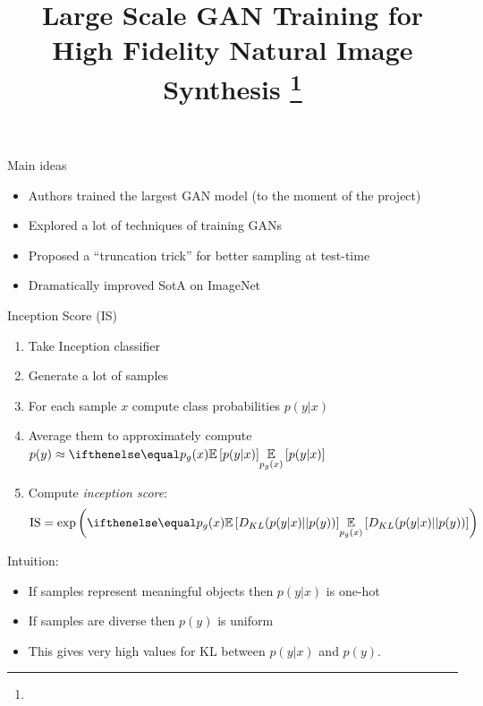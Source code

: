 \documentclass[handout, 10pt]{beamer}
\title{Large Scale GAN Training for High Fidelity Natural Image Synthesis \footnote{\citepaper{BigGAN}}}
\begin{document}
\begin{frame}
    \titlepage
\end{frame}

\begin{frame}{Main ideas}
    \pause
    \begin{itemize}
        \item\pause Authors trained the largest GAN model (to the moment of the project)
        \item\pause Explored a lot of techniques of training GANs
        \item\pause Proposed a ``truncation trick'' for better sampling at test-time
        \item\pause Dramatically improved SotA on ImageNet
    \end{itemize}
\end{frame}

\begin{frame}{Inception Score (IS)}
    \begin{enumerate}
        \item\pause Take Inception classifier
        \item\pause Generate a lot of samples
        \item\pause For each sample $x$ compute class probabilities $p(y|x)$
        \item\pause Average them to approximately compute $p(y) \approx \expect[p_g(x)]{p(y|x)}$
        \item\pause Compute \textit{inception score}:
\begin{equation}
\mathrm{IS}=\exp \left(\expect[p_{g}(x)]{D_{K L}(p(y | x)|| p(y))}\right)
\end{equation}
    \end{enumerate}

\pause
Intuition:
\begin{itemize}
    \item\pause If samples represent meaningful objects then $p(y|x)$ is one-hot
    \item\pause If samples are diverse then $p(y)$ is uniform
    \item\pause This gives very high values for KL between $p(y|x)$ and $p(y)$.
\end{itemize}

\end{frame}
\end{document}

